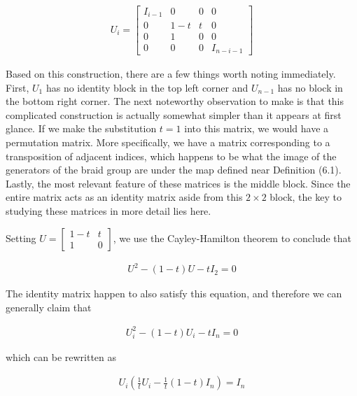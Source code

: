 \documentclass[10pt]{ucthesis}
\begin{document}
\begin{equation}
\begin{aligned}
U_i = \begin{bmatrix}
			I_{i-1}& 0 & 0 & 0 \\
			0 & 1-t & t & 0\\
			0 & 1 & 0 & 0\\
			0 & 0 & 0 & I_{n-i-1}
		\end{bmatrix}
\end{aligned}
\end{equation}

Based on this construction, there are a few things worth noting immediately. First, $U_1$ has no identity block in the top left corner and $U_{n-1}$ has no block in the bottom right corner. The next noteworthy observation to make is that this complicated construction is actually somewhat simpler than it appears at first glance. If we make the substitution $t=1$ into this matrix, we would have a permutation matrix. More specifically, we have a matrix corresponding to a transposition of adjacent indices, which happens to be what the image of the generators of the braid group are under the map defined near Definition (6.1). Lastly, the most relevant feature of these matrices is the middle block. Since the entire matrix acts as an identity matrix aside from this $2\times 2$ block, the key to studying these matrices in more detail lies here.

Setting $U= \begin{bmatrix} 1-t & t\\1 & 0 \end{bmatrix}$, we use the Cayley-Hamilton theorem to conclude that

\begin{equation}
\begin{aligned}
	U^2 - (1-t)U - tI_2 = 0
\end{aligned}
\end{equation}

The identity matrix happen to also satisfy this equation, and therefore we can generally claim that 

\begin{equation}
\begin{aligned}
	U_i^2 - (1-t)U_i - tI_n = 0
\end{aligned}
\end{equation}

which can be rewritten as 

\begin{equation}
\begin{aligned}
	U_i(\frac{1}{t}U_i - \frac{1}{t}(1-t)I_n) =I_n 
\end{aligned}
\end{equation}
\end{document}
